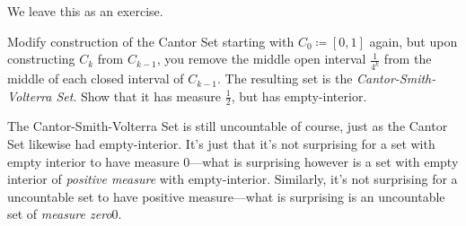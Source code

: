 \begin{exm}\label{CantorSmithVolterraSet}
We leave this as an exercise.
\begin{exr}
Modify construction of the Cantor Set starting with $C_0\coloneqq [0,1]$ again, but upon constructing $C_k$ from $C_{k-1}$, you remove the middle open interval $\frac{1}{4^k}$ from the middle of each closed interval of $C_{k-1}$.  The resulting set is the \emph{Cantor-Smith-Volterra Set}.  Show that it has measure $\frac{1}{2}$, but has empty-interior.
\end{exr}
\begin{rmk}
The Cantor-Smith-Volterra Set is still uncountable of course, just as the Cantor Set likewise had empty-interior.  It's just that it's not surprising for a set with empty interior to have measure $0$---what is surprising however is a set with empty interior of \emph{positive measure} with empty-interior.  Similarly, it's not surprising for a uncountable set to have positive measure---what is surprising is an uncountable set of \emph{measure zero}0.
\end{rmk}
\end{exm}
